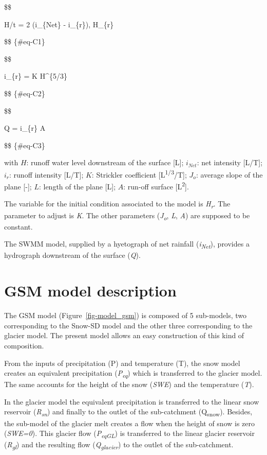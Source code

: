 \documentclass[
  letterpaper,
  DIV=11,
  numbers=noendperiod]{scrreprt}
\begin{document}
\$\$

H/t = 2 \cdot (i\_\{Net\} - i\_\{r\}),
\quad H\_\{r\} 

\$\$ \{\#eq-C1\}

\$\$

i\_\{r\} = K \cdot {} \cdot H\^{}\{5/3\} \cdot {}

\$\$ \{\#eq-C2\}

\$\$

Q = i\_\{r\} \cdot A

\$\$ \{\#eq-C3\}

with \(H\): runoff water level downstream of the surface {[}L{]};
\(i_{Net}\): net intensity {[}L/T{]}; \(i_r\): runoff intensity
{[}L/T{]}; \(K\): Strickler coefficient {[}L\textsuperscript{1/3}/T{]};
\(J_o\): average slope of the plane {[}-{]}; \(L\): length of the plane
{[}L{]}; \(A\): run-off surface {[}L\textsuperscript{2}{]}.

The variable for the initial condition associated to the model is
\emph{H\textsubscript{r}}. The parameter to adjust is \emph{K}. The
other parameters (\emph{J\textsubscript{o}}, \emph{L}, \emph{A}) are
supposed to be constant.

The SWMM model, supplied by a hyetograph of net rainfall
(\emph{i\textsubscript{Net}}), provides a hydrograph downstream of the
surface (\emph{Q}).

\hypertarget{sec-model_gsm}{%
\chapter{GSM model description}\label{sec-model_gsm}}

The GSM model (Figure~\ref{fig-model_gsm}) is composed of 5 sub-models,
two corresponding to the Snow-SD model and the other three corresponding
to the glacier model. The present model allows an easy construction of
this kind of composition.

From the inputs of precipitation (P) and temperature (T), the snow model
creates an equivalent precipitation (\emph{P\textsubscript{eq}}) which
is transferred to the glacier model. The same accounts for the height of
the snow (\emph{SWE}) and the temperature (\emph{T}).

In the glacier model the equivalent precipitation is transferred to the
linear snow reservoir (\emph{R\textsubscript{sn}}) and finally to the
outlet of the sub-catchment (Q\textsubscript{snow}). Besides, the
sub-model of the glacier melt creates a flow when the height of snow is
zero (\emph{SWE=0}). This glacier flow (\emph{P\textsubscript{eqGL}}) is
transferred to the linear glacier reservoir (\emph{R\textsubscript{gl}})
and the resulting flow (\emph{Q\textsubscript{glacier}}) to the outlet
of the sub-catchment.
\end{document}

